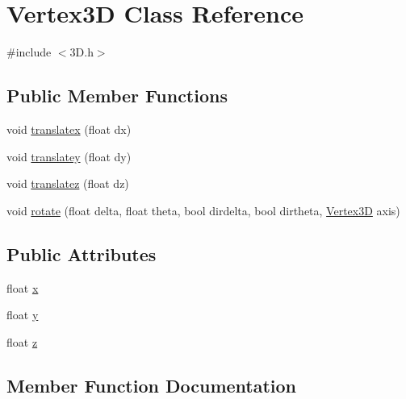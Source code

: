 \hypertarget{class_vertex3_d}{}\section{Vertex3D Class Reference}
\label{class_vertex3_d}


{\ttfamily \#include $<$3\+D.\+h$>$}

\subsection*{Public Member Functions}
\begin{DoxyCompactItemize}
\item 
void \hyperlink{class_vertex3_d_a55c9e183f88bd026fb4563200f189895}{translatex} (float dx)
\item 
void \hyperlink{class_vertex3_d_afecdb92ffcdc23ceed0772ac9ce42f05}{translatey} (float dy)
\item 
void \hyperlink{class_vertex3_d_a74d4ae70ac0a9cb92e121d7607d42040}{translatez} (float dz)
\item 
void \hyperlink{class_vertex3_d_a3beec96a84611a22956c63b751d1ae40}{rotate} (float delta, float theta, bool dirdelta, bool dirtheta, \hyperlink{class_vertex3_d}{Vertex3D} axis)
\end{DoxyCompactItemize}
\subsection*{Public Attributes}
\begin{DoxyCompactItemize}
\item 
float \hyperlink{class_vertex3_d_a31874fac8de9ea8aa004f7d62c3b0a82}{x}
\item 
float \hyperlink{class_vertex3_d_acc2ceb770e03d6facf4c921de0eaf3d8}{y}
\item 
float \hyperlink{class_vertex3_d_af04a23eeeea792a53123e2d622395f8f}{z}
\end{DoxyCompactItemize}


\subsection{Member Function Documentation}

